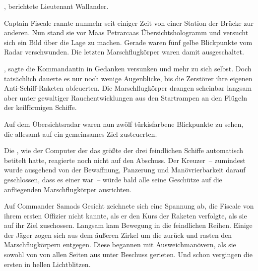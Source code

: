 , berichtete Lieutenant Wallander. 

\par

Captain Fiscale rannte nunmehr seit einiger Zeit von einer Station der Brücke zur anderen. Nun stand sie vor Maas Petrarcaas Übersichtshologramm und versucht sich ein Bild über die Lage zu machen. Gerade waren fünf gelbe Blickpunkte vom Radar verschwunden. Die letzten Marschflugkörper waren damit ausgeschaltet.

\par

, sagte die Kommandantin in Gedanken versunken und mehr zu sich selbst. Doch tatsächlich dauerte es nur noch wenige Augenblicke, bis die Zerstörer ihre eigenen Anti-Schiff-Raketen abfeuerten. Die Marschflugkörper drangen scheinbar langsam aber unter gewaltiger Rauchentwicklungen aus den Startrampen an den Flügeln der keilförmigen Schiffe.

\par

Auf dem Übersichtsradar waren nun zwölf türkisfarbene Blickpunkte zu sehen, die allesamt auf ein gemeinsames Ziel zusteuerten.

\par

Die , wie der Computer der  das größte der drei feindlichen Schiffe automatisch betitelt hatte, reagierte noch nicht auf den Abschuss. Der Kreuzer~-- zumindest wurde ausgehend von der Bewaffnung, Panzerung und Manövrierbarkeit darauf geschlossen, dass es einer war~-- würde bald alle seine Geschütze auf die anfliegenden Marschflugkörper ausrichten.

\par

Auf Commander Samads Gesicht zeichnete sich eine Spannung ab, die Fiscale von ihrem ersten Offizier nicht kannte, als er den Kurs der Raketen verfolgte, als sie auf ihr Ziel zuschossen. Langsam kam Bewegung in die feindlichen Reihen. Einige der Jäger zogen sich aus dem äußeren Zirkel um die  zurück und rasten den Marschflugkörpern entgegen. Diese begannen mit Ausweichmanövern, als sie sowohl von von allen Seiten aus unter Beschuss gerieten. Und schon vergingen die ersten in hellen Lichtblitzen.

\par

